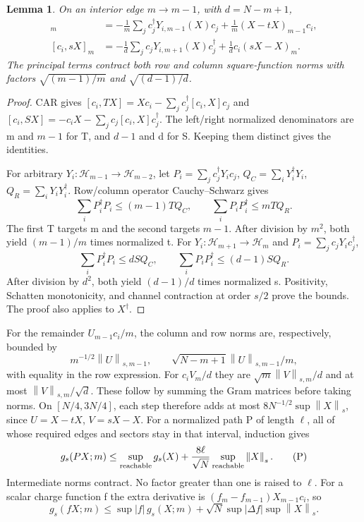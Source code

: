 \documentclass[11pt]{article}
\newcommand{\norm}[1]{\left\lVert#1\right\rVert}
\newcommand{\Hh}{\mathcal H}
\newtheorem{lemma}{Lemma}
\begin{document}
\begin{lemma}\label{lem:channel}
On an interior edge $m\to m-1$, with $d=N-m+1$,
\begin{align}
 [c_i,tX]_m&=-\frac1m\sum_jc_j^\dagger Y_{i,m-1}(X)c_j
       +\frac1m(X-tX)_{m-1}c_i,\label{eq:tgrad}\\
 [c_i,sX]_m&=-\frac1d\sum_jc_jY_{i,m+1}(X)c_j^\dagger
       +\frac1d c_i(sX-X)_m.\label{eq:sgrad}
\end{align}
The principal terms contract both row and column square-function
norms with factors $\sqrt{(m-1)/m}$ and $\sqrt{(d-1)/d}$.
\end{lemma}
\begin{proof}
CAR gives $[c_i,TX]=Xc_i-\sum_jc_j^\dagger[c_i,X]c_j$ and
$[c_i,SX]=-c_iX-\sum_jc_j[c_i,X]c_j^\dagger$.
The left/right normalized denominators are m and $m-1$ for T,
and $d-1$ and d for S. Keeping them distinct gives the identities.

For arbitrary $Y_i:\Hh_{m-1}\to\Hh_{m-2}$, let
$P_i=\sum_jc_j^\dagger Y_i c_j$,
$Q_C=\sum_iY_i^\dagger Y_i$, $Q_R=\sum_iY_iY_i^\dagger$.
Row/column operator Cauchy--Schwarz gives
\[
 \sum_iP_i^\dagger P_i\le(m-1)TQ_C,\qquad
 \sum_iP_iP_i^\dagger\le mTQ_R.
\]
The first T targets m and the second targets $m-1$. After division
by $m^2$, both yield $(m-1)/m$ times normalized t. For
$Y_i:\Hh_{m+1}\to\Hh_m$ and $P_i=\sum_jc_jY_i c_j^\dagger$,
\[
 \sum_iP_i^\dagger P_i\le dSQ_C,\qquad
 \sum_iP_iP_i^\dagger\le(d-1)SQ_R.
\]
After division by $d^2$, both yield $(d-1)/d$ times normalized s.
Positivity, Schatten monotonicity, and channel contraction at order
$s/2$ prove the bounds. The proof also applies to $X^\dagger$.
\end{proof}

For the remainder $U_{m-1}c_i/m$, the column and row norms are,
respectively, bounded by
\[
 m^{-1/2}\norm U_{s,m-1},\qquad
 \sqrt{N-m+1}\norm U_{s,m-1}/m,
\]
with equality in the row expression. For $c_iV_m/d$ they are
$\sqrt m\norm V_{s,m}/d$ and at most $\norm V_{s,m}/\sqrt d$.
These follow by summing the Gram matrices before taking norms.
On $[N/4,3N/4]$, each step therefore adds at most
$8N^{-1/2}\sup\norm X_s$, since $U=X-tX$, $V=sX-X$.
For a normalized path P of length $\ell$, all of whose required
edges and sectors stay in that interval, induction gives
\[
 g_s(PX;m)\le\sup_{\rm reachable}g_s(X)
   +\frac{8\ell}{\sqrt N}\sup_{\rm reachable}\norm X_s. \tag{P}
\]
Intermediate norms contract. No factor greater than one is raised
to $\ell$. For a scalar charge function f the extra derivative is
$(f_m-f_{m-1})X_{m-1}c_i$, so
\[
 g_s(fX;m)\le\sup|f|\,g_s(X;m)
    +\sqrt N\sup|\Delta f|\sup\norm X_s. \tag{F}
\]
\end{document}
